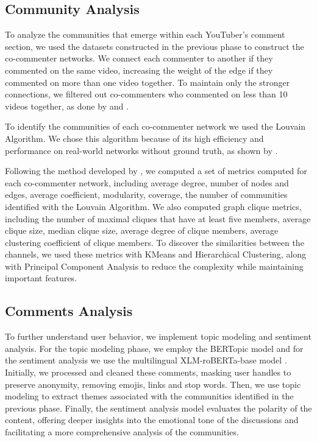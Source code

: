 \documentclass[12pt]{article}
\begin{document}
\subsection{Community Analysis}

To analyze the communities that emerge within each YouTuber's comment section, we used the datasets constructed 
in the previous phase to construct the co-commenter networks. We connect each commenter to
another if they commented on the same video, increasing the weight of the edge if they commented
on more than one video together. To maintain only the stronger connections, we filtered out co-commenters
who commented on less than 10 videos together, as done by \cite{shajari2023} and \cite{kirdemir2023}. 

To identify the communities of each co-commenter network we used the Louvain Algorithm. We chose this 
algorithm because of its high efficiency and performance on real-world networks
without ground truth, as shown by \cite{YOU2020104822}.

Following the method developed by \cite{kirdemir2023}, we computed a set of metrics computed 
for each co-commenter network, including average degree, number of nodes and edges, average coefficient,
modularity, coverage, the number of communities identified with the Louvain Algorithm. We also computed graph clique 
metrics, including the number of maximal cliques that have at least five members, 
average clique size, median clique size, average degree of clique members, average clustering coefficient
of clique members. To discover the similarities between the channels, we used these metrics 
with KMeans and Hierarchical Clustering, along with Principal Component Analysis to reduce the complexity
while maintaining important features.

\subsection{Comments Analysis}

To further understand user behavior, we implement
topic modeling and sentiment analysis. For the topic modeling phase, we employ the BERTopic model 
\cite{bertopic2022} and for the sentiment analysis we use the multilingual 
XLM-roBERTa-base model \cite{barbieri-etal-2022-xlm}. 
Initially, we  processed and cleaned these comments, masking user handles to preserve anonymity,
removing emojis, links and stop words.
Then, we use topic modeling to extract themes associated with the communities identified in the 
previous phase. Finally, the sentiment analysis model evaluates the polarity of the content, 
offering deeper insights into the emotional tone of the discussions and facilitating a more 
comprehensive analysis of the communities.
\end{document}
